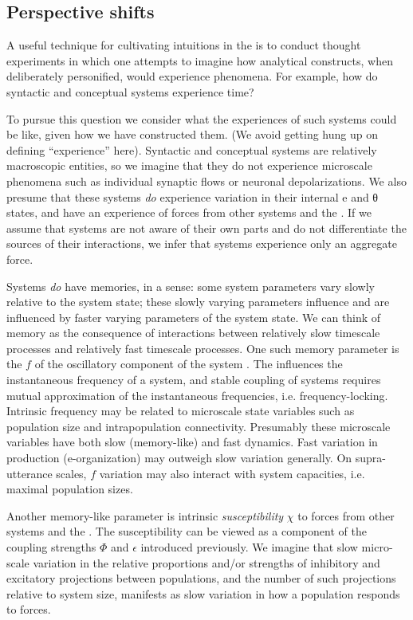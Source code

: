 \subsection{Perspective shifts}

A useful technique for cultivating intuitions in the  is to conduct thought experiments in which one attempts to imagine how analytical constructs, when deliberately personified, would experience phenomena. For example, how do syntactic and conceptual systems experience time? 

  To pursue this question we consider what the experiences of such systems could be like, given how we have constructed them. (We avoid getting hung up on defining “experience” here). Syntactic and conceptual systems are relatively macroscopic entities, so we imagine that they do not experience microscale phenomena such as individual synaptic flows or neuronal depolarizations. We also presume that these systems \textit{do} experience variation in their internal e and θ states, and have an experience of forces from other systems and the . If we assume that systems are not aware of their own parts and do not differentiate the sources of their interactions, we infer that systems experience only an aggregate force. 

  Systems \textit{do} have memories, in a sense: some system parameters vary slowly relative to the system state; these slowly varying parameters influence and are influenced by faster varying parameters of the system state. We can think of memory as the consequence of interactions between relatively slow timescale processes and relatively fast timescale processes. One such memory parameter is the  $f$ of the oscillatory component of the system . The  influences the instantaneous frequency of a system, and stable coupling of systems requires mutual approximation of the instantaneous frequencies, i.e. frequency-locking. Intrinsic frequency may be related to microscale state variables such as population size and intrapopulation connectivity. Presumably these microscale variables have both slow (memory-like) and fast dynamics. Fast variation in production (e-organization) may outweigh slow variation generally. On supra-utterance scales, $f$ variation may also interact with system capacities, i.e. maximal population sizes. 

  Another memory-like parameter is intrinsic \textit{susceptibility} $χ$ to forces from other systems and the . The susceptibility can be viewed as a component of the coupling strengths $\Phi$ and $\epsilon$ introduced previously. We imagine that slow micro-scale variation in the relative proportions and/or strengths of inhibitory and excitatory projections between populations, and the number of such projections relative to system size, manifests as slow variation in how a population responds to forces.

